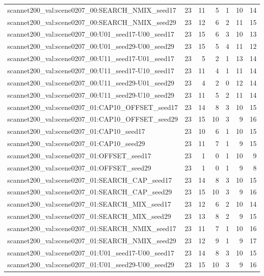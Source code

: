 \begin{table}[t]
\begin{tabular}{lrrrrrr}
scannet200\_val:scene0207\_00:SEARCH\_NMIX\_seed17 & 23 & 11 & 5 & 1 & 10 & 14 \\
scannet200\_val:scene0207\_00:SEARCH\_NMIX\_seed29 & 23 & 12 & 6 & 2 & 11 & 15 \\
scannet200\_val:scene0207\_00:U01\_seed17-U00\_seed17 & 23 & 15 & 6 & 3 & 10 & 13 \\
scannet200\_val:scene0207\_00:U01\_seed29-U00\_seed29 & 23 & 15 & 5 & 4 & 11 & 12 \\
scannet200\_val:scene0207\_00:U11\_seed17-U01\_seed17 & 23 & 5 & 2 & 1 & 13 & 14 \\
scannet200\_val:scene0207\_00:U11\_seed17-U10\_seed17 & 23 & 11 & 4 & 1 & 11 & 14 \\
scannet200\_val:scene0207\_00:U11\_seed29-U01\_seed29 & 23 & 4 & 2 & 0 & 12 & 14 \\
scannet200\_val:scene0207\_00:U11\_seed29-U10\_seed29 & 23 & 11 & 5 & 2 & 11 & 14 \\
scannet200\_val:scene0207\_01:CAP10\_OFFSET\_seed17 & 23 & 14 & 8 & 3 & 10 & 15 \\
scannet200\_val:scene0207\_01:CAP10\_OFFSET\_seed29 & 23 & 15 & 10 & 3 & 9 & 16 \\
scannet200\_val:scene0207\_01:CAP10\_seed17 & 23 & 10 & 6 & 1 & 10 & 15 \\
scannet200\_val:scene0207\_01:CAP10\_seed29 & 23 & 11 & 7 & 1 & 9 & 15 \\
scannet200\_val:scene0207\_01:OFFSET\_seed17 & 23 & 1 & 0 & 1 & 10 & 9 \\
scannet200\_val:scene0207\_01:OFFSET\_seed29 & 23 & 1 & 0 & 1 & 9 & 8 \\
scannet200\_val:scene0207\_01:SEARCH\_CAP\_seed17 & 23 & 14 & 8 & 3 & 10 & 15 \\
scannet200\_val:scene0207\_01:SEARCH\_CAP\_seed29 & 23 & 15 & 10 & 3 & 9 & 16 \\
scannet200\_val:scene0207\_01:SEARCH\_MIX\_seed17 & 23 & 12 & 6 & 2 & 10 & 14 \\
scannet200\_val:scene0207\_01:SEARCH\_MIX\_seed29 & 23 & 13 & 8 & 2 & 9 & 15 \\
scannet200\_val:scene0207\_01:SEARCH\_NMIX\_seed17 & 23 & 11 & 7 & 1 & 10 & 16 \\
scannet200\_val:scene0207\_01:SEARCH\_NMIX\_seed29 & 23 & 12 & 9 & 1 & 9 & 17 \\
scannet200\_val:scene0207\_01:U01\_seed17-U00\_seed17 & 23 & 14 & 8 & 3 & 10 & 15 \\
scannet200\_val:scene0207\_01:U01\_seed29-U00\_seed29 & 23 & 15 & 10 & 3 & 9 & 16 \\

\end{tabular}
\end{table}
